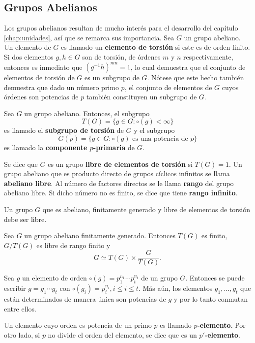 \subsection{Grupos Abelianos}
Los grupos abelianos resultan de mucho interés para el desarrollo del capítulo \ref{chap:unidades}, así que se remarca sus importancia.
Sea $G$ un grupo abeliano. Un elemento de $G$ es llamado un \textbf{elemento de torsión} si este es de orden finito. Si dos elementos $g,h \in G$ son de torsión, de órdenes $m$ y $n$ respectivamente, entonces es inmediato que $(g^{-1}h)^{mn} = 1$, lo cual demuestra que el conjunto de elementos de torsión de $G$ es un subgrupo de $G$. Nótese que este hecho también demuestra que dado un número primo $p$, el conjunto de elementos de $G$ cuyos órdenes son potencias de $p$ también constituyen un subgrupo de $G$.
\begin{definicion}
Sea $G$ un grupo abeliano. Entonces, el subgrupo 
\[T(G) = \{ g \in G \colon \circ(g) < \infty \}  \]
es llamado el \textbf{subgrupo de torsión} de $G$ y el subgrupo \[ G(p) = \{g \in G \colon \circ(g) \mbox{ es una potencia de } p  \} \] es llamado la \textbf{componente $p$-primaria} de $G$.
\end{definicion}
Se dice que $G$ es un grupo \textbf{libre de elementos de torsión} si $T(G) = 1$.
Un grupo abeliano que es producto directo de grupos cíclicos infinitos se llama \textbf{abeliano libre}. Al número de factores directos se le llama \textbf{rango} del grupo abeliano libre. Si dicho número no es finito, se dice que tiene \textbf{rango infinito}.
\begin{teorema}
Un grupo $G$ que es abeliano, finitamente generado y libre de elementos de torsión debe ser libre.
\end{teorema}
\begin{teorema}
Sea $G$ un grupo abeliano finitamente generado. Entonces $T(G)$ es finito, $G/T(G)$ es libre de rango finito y \[ G \simeq T(G)\times \frac{G}{T(G)}. \]
\end{teorema}
\begin{lema}
Sea $g$ un elemento de orden $\circ(g) = p_1^{n_1}\cdots p_t^{n_t}$ de un grupo $G$. Entonces se puede escribir $g = g_1\cdots g_t$ con $\circ(g_i) = p_i^{n_i}, i\leq i \leq t$. Más aún, los elementos $g_1, \dots, g_t$ que están determinados de manera única son potencias de $g$ y por lo tanto conmutan entre ellos. 
\end{lema}
Un elemento cuyo orden es potencia de un primo $p$ es llamado  \textbf{$p$-elemento}. Por otro lado, si $p$ no divide el orden del elemento, se dice que es un \textbf{$p'$-elemento}.
